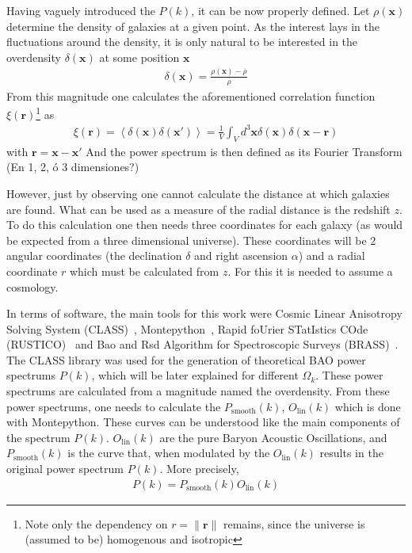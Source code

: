 Having vaguely introduced the $P(k)$, it can be now properly defined. Let  $\rho(\textbf{x})$ determine the density of galaxies at a given point. As the interest lays in the fluctuations around the density, it is only natural to be interested in the overdensity $\delta(\textbf{x})$ at some position $\textbf{x}$
\begin{align}
	\delta(\textbf{x}) = \frac{\rho\left( \textbf{x} \right) - \overline{\rho}}{\overline{\rho}}
\end{align}
From this magnitude one calculates the aforementioned correlation function $\xi(\textbf{r})$\footnote{Note only the dependency on $r = \|\textbf{r}\|$ remains, since the universe is (assumed to be) homogenous and isotropic} as 
\begin{align}
	\xi(\textbf{r}) = \left<\delta(\textbf{x}) \delta(\textbf{x}') \right> = \frac{1}{V}\int_{V}^{}  d^3 \textbf{x} \delta(\textbf{x}) \delta\left(\textbf{x} - \textbf{r}  \right) 
\end{align} with $\textbf{r} = \textbf{x} - \textbf{x}'$
And the power spectrum is then defined as its Fourier Transform  (En 1, 2, ó 3 dimensiones?)

However, just by observing one cannot calculate the distance at which galaxies are found. What can be used as a measure of the radial distance is the redshift $z$. To do this calculation one then needs three coordinates for each galaxy (as would be expected from a three dimensional universe). These coordinates will be 2 angular coordinates (the declination $\delta$ and right ascension $\alpha$) and a radial coordinate $r$ which must be calculated from $z$. For this it is needed to assume a cosmology.

In terms of software, the main tools for this work were Cosmic Linear Anisotropy Solving System (CLASS)~\cite{class}, Montepython~\cite{montepython}, Rapid foUrier STatIstics COde (RUSTICO)~\cite{rustico} and Bao and Rsd Algorithm for Spectroscopic Surveys (BRASS)~\cite{brass}. \\

The CLASS library was used for the generation of theoretical BAO power spectrums $P(k)$, which will be later explained for different $\Omega_k$. These power spectrums are calculated from a magnitude named the overdensity. 
From these power spectrums, one needs to calculate the $P_\text{smooth}(k)$, $O_{\text{lin}}(k)$ which is done with Montepython. These curves can be understood like the main components of the spectrum $P(k)$. $O_{\text{lin}}(k)$ are the pure Baryon Acoustic Oscillations, and $P_{\text{smooth}}(k)$ is the curve that, when modulated by the $O_{\text{lin}}(k)$ results in the original power spectrum $P(k)$. More precisely,
\begin{align}
	P(k) = P_{\text{smooth}}(k) O_{\text{lin}}(k)
\end{align}

